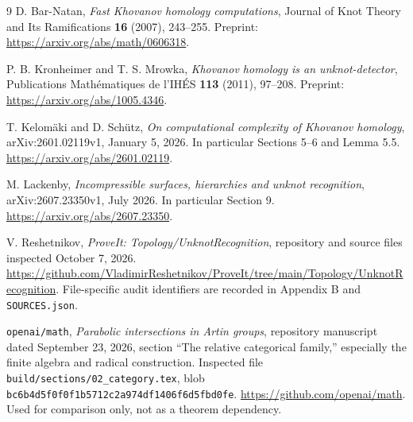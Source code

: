 \documentclass[11pt]{article}
\theoremstyle{definition}\newtheorem{definition}[theorem]{Definition}
\theoremstyle{remark}\newtheorem{remark}[theorem]{Remark}
\begin{document}
\begin{thebibliography}{9}
D. Bar-Natan, \emph{Fast Khovanov homology computations}, Journal of Knot Theory and Its Ramifications \textbf{16} (2007), 243--255. Preprint: \url{https://arxiv.org/abs/math/0606318}.

P. B. Kronheimer and T. S. Mrowka, \emph{Khovanov homology is an unknot-detector}, Publications Math\'ematiques de l'IH\'ES \textbf{113} (2011), 97--208. Preprint: \url{https://arxiv.org/abs/1005.4346}.

T. Kelom\"aki and D. Sch\"utz, \emph{On computational complexity of Khovanov homology}, arXiv:2601.02119v1, January 5, 2026. In particular Sections 5--6 and Lemma 5.5. \url{https://arxiv.org/abs/2601.02119}.

M. Lackenby, \emph{Incompressible surfaces, hierarchies and unknot recognition}, arXiv:2607.23350v1, July 2026. In particular Section 9. \url{https://arxiv.org/abs/2607.23350}.

V. Reshetnikov, \emph{ProveIt: Topology/UnknotRecognition}, repository and source files inspected October 7, 2026. \url{https://github.com/VladimirReshetnikov/ProveIt/tree/main/Topology/UnknotRecognition}. File-specific audit identifiers are recorded in Appendix B and \texttt{SOURCES.json}.

\texttt{openai/math}, \emph{Parabolic intersections in Artin groups}, repository manuscript dated September 23, 2026, section ``The relative categorical family,'' especially the finite algebra and radical construction. Inspected file \texttt{build/sections/02\_category.tex}, blob \texttt{bc6b4d5f0f0f1b5712c2a974df1406f6d5fbd0fe}. \url{https://github.com/openai/math}. Used for comparison only, not as a theorem dependency.
\end{thebibliography}
\end{document}
